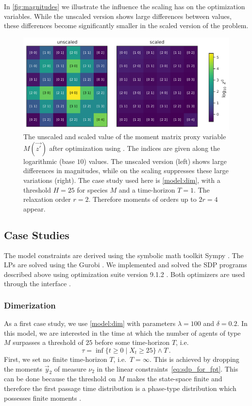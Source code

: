 In \autoref{fig:magnitudes} we illustrate the influence the scaling has on the
optimization variables. While the unscaled version shows large differences
between values, these differences become significantly smaller in the scaled version
of the problem.
\begin{figure}[htb]
    \centering
    \includegraphics[width=\textwidth]{gfx/magnitudes.pdf}
	\caption[Moment matrix scaling]{The unscaled and scaled value of the moment matrix proxy variable
    $M(\vec{z'})$ after optimization using . The indices are given along the
    logarithmic (base $10$) values. The unscaled version (left) shows large
    differences in magnitudes, while on the scaling suppresses
    these large variations (right). The case study used here is \autoref{model:dim},
    with a threshold $H=25$ for species $M$ and a time-horizon $T=1$. The
    relaxation order $r=2$. Therefore moments of orders up to $2r=4$ appear.}
    \label{fig:magnitudes}
\end{figure}


\subsection{Case Studies}
The model constraints are derived using the symbolic math toolkit Sympy \parencite{sympy}.
The \acp{LP} are solved using the Gurobi \parencite{gurobi}.
We implemented and solved the \ac{SDP} programs described above using optimization suite  version 9.1.2 \parencite{mosek}.
Both optimizers are used through the  interface \parencite{cvxpy}.

\subsubsection*{Dimerization}
As a first case study, we use \autoref{model:dim} with parameters $\lambda=100$ and $\delta=0.2$.
In this model, we are interested in the time at which the number of agents of type $M$
surpasses a threshold of $25$ before some time-horizon $T$,
i.e.\ \[
	\tau=\inf\{t\geq 0\mid X_t \geq 25\}\land T\,.
\]
First, we set no finite time-horizon $T$, i.e.\ $T=\infty$.
This is achieved by dropping the moments $\vec y_2$
of measure $\nu_2$ in the linear constraints~\eqref{eq:sdp_for_fpt}.
This can be done because the threshold on $M$ makes the state-space finite
and therefore the first passage time distribution is a phase-type distribution
which possesses finite moments \parencite[][Chapter 7.6]{stewart2009probability}.

